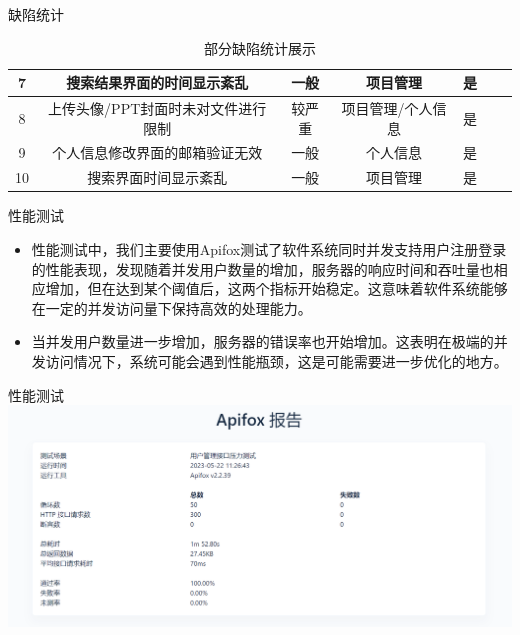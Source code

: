 \begin{frame}{缺陷统计}
\begin{table}[]
{\begin{tabular}{c|c|c|c|c|c|c}
                \hline
                7             & 搜索结果界面的时间显示紊乱                                                             & 一般                & 项目管理          & 是                    &                                  &                                                                    \\
                \hline
                8             & 上传头像/PPT封面时未对文件进行限制                                                     & 较严重              & 项目管理/个人信息 & 是                    &                                  &                                                                    \\
                \hline
                9             & 个人信息修改界面的邮箱验证无效                                                         & 一般                & 个人信息          & 是                    &                                  &                                                                    \\
                \hline
                10            & 搜索界面时间显示紊乱                                                                   & 一般                & 项目管理          & 是                    &                                  &                                                                    \\
                \hline
            \end{tabular}
        }
        \caption{部分缺陷统计展示}
        \label{tab:tech-strategy}
    \end{table}
\end{frame}

\begin{frame}{性能测试}
    \begin{itemize}
    \item 性能测试中，我们主要使用Apifox测试了软件系统同时并发支持用户注册登录的性能表现，发现随着并发用户数量的增加，服务器的响应时间和吞吐量也相应增加，但在达到某个阈值后，这两个指标开始稳定。这意味着软件系统能够在一定的并发访问量下保持高效的处理能力。
    \item 当并发用户数量进一步增加，服务器的错误率也开始增加。这表明在极端的并发访问情况下，系统可能会遇到性能瓶颈，这是可能需要进一步优化的地方。
    \end{itemize}
\end{frame}

\begin{frame}{性能测试}
    \includegraphics[width=\textwidth]{contents/figure/apifox_report.png}
\end{frame}


